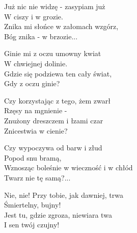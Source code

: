 \begin{text}
    Już nic nie widzę - zasypiam już\\
    W ciszy i w grozie.\\
    Znika mi słońce w załomach wzgórz,\\
    Bóg znika - w brzozie...

    Ginie mi z oczu umowny kwiat\\
    W chwiejnej dolinie.\\
    Gdzie się podziewa ten cały świat,\\
    Gdy z oczu ginie?

    Czy korzystając z tego, żem zwarł\\
    Rzęsy na mgnienie -\\
    Znużony dreszczem i łzami czar\\
    Znicestwia w cienie?

    Czy wypoczywa od barw i złud\\
    Popod snu bramą,\\
    Wznosząc boleśnie w wieczność i w chłód\\
    Twarz nie tę samą?...

    Nie, nie! Przy tobie, jak dawniej, trwa\\
    Śmiertelny, bujny!\\
    Jest tu, gdzie zgroza, niewiara twa\\
    I sen twój czujny!
\end{text}
\begin{chord}

\end{chord}